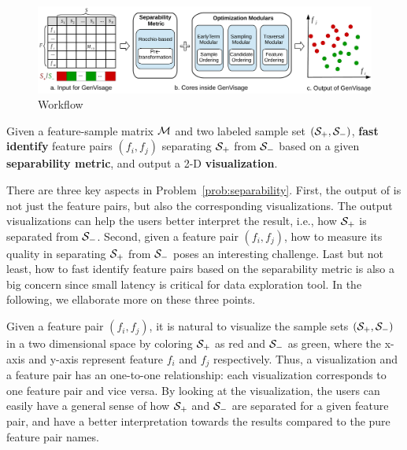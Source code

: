 
\begin{figure}[t]
	\centering
	\includegraphics[width=0.9\linewidth]{fig/workflow2.pdf}
\caption{\genviz Workflow}
\label{fig:workflow}
\end{figure} 



\begin{formulation}[Separability]\label{prob:separability}
Given a feature-sample matrix $\mm$ and two labeled sample set $(\sss_+,\sss_-)$, \textbf{fast identify} \topk feature pairs $(f_i,f_j)$ separating $\sss_+$ from $\sss_-$ based on a given \textbf{separability metric}, and output a 2-D \textbf{visualization}.
\end{formulation}
There are three key aspects in Problem~\ref{prob:separability}. First, the output of \genviz is not just the \topk feature pairs, but also the corresponding visualizations. The output visualizations can help the users better interpret the result, i.e., how $\sss_+$ is separated from $\sss_-$. Second, given a feature pair $(f_i,f_j)$, how to measure its quality in separating $\sss_+$ from $\sss_-$ poses an interesting challenge. Last but not least, how to fast identify \topk feature pairs based on the separability metric is also a big concern since small latency is critical for data exploration tool. In the following, we ellaborate more on these three points.

 Given a feature pair $(f_i,f_j)$, it is natural to visualize the sample sets $(\sss_+,\sss_-)$ in a two dimensional space by coloring $\sss_+$ as red and $\sss_-$ as green, where the x-axis and y-axis represent feature $f_i$ and $f_j$ respectively. Thus, a visualization and a feature pair has an one-to-one relationship: each visualization corresponds to one feature pair and vice versa. By looking at the visualization, the users can easily have a general sense of how $\sss_+$ and $\sss_-$ are separated for a given feature pair, and have a better interpretation towards the results compared to the pure feature pair names.



